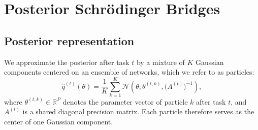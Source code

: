 \documentclass{article}
\begin{document}
\section{Posterior Schr\"odinger Bridges}
\label{sec:method}


\subsection{Posterior representation}
\label{sec:representation}

We approximate the posterior after task $t$ by a mixture of $K$ Gaussian
components centered on an ensemble of networks, which we refer to as particles:
\begin{equation}
\hat q^{(t)}(\theta)
=
\frac{1}{K}
\sum_{k=1}^{K}
\mathcal{N}\left(
\theta;\theta^{(t,k)},\big(A^{(t)}\big)^{-1}
\right),
\label{eq:mixture}
\end{equation}
where $\theta^{(t,k)}\in\mathbb{R}^P$ denotes the parameter vector of particle
$k$ after task $t$, and $A^{(t)}$ is a shared diagonal precision matrix. Each
particle therefore serves as the center of one Gaussian component.
\end{document}
